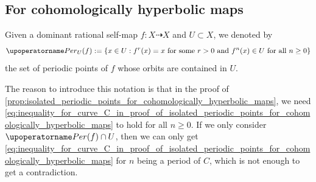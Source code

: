 \subsection{For cohomologically hyperbolic maps}

Given a dominant rational self-map $f: X \dashrightarrow X$ and $U \subset X$, we denoted by
\[ \Per_U(f) := \{x \in U: f^r(x) = x \text{ for some } r > 0 \text{ and } f^n(x) \in U \text{ for all } n \geq 0\} \]
the set of periodic points of $f$ whose orbits are contained in $U$.

\begin{remark}
	The reason to introduce this notation is that in the proof of \cref{prop:isolated_periodic_points_for_cohomologically_hyperbolic_maps}, we need \cref{eq:inequality_for_curve_C_in_proof_of_isolated_periodic_points_for_cohomologically_hyperbolic_maps} to hold for all $n \geq 0$.
	If we only consider $\Per(f) \cap U$, then we can only get \cref{eq:inequality_for_curve_C_in_proof_of_isolated_periodic_points_for_cohomologically_hyperbolic_maps} for $n$ being a period of $C$, which is not enough to get a contradiction.
\end{remark}

